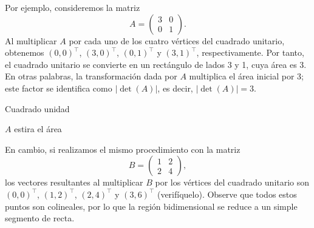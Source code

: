 \documentclass[compacto,10pt]{pubciencias-notas}
\begin{document}
Por ejemplo, consideremos la matriz
\[
    A = \begin{pmatrix} 3 & 0 \\ 0 & 1 \end{pmatrix}.
\]
Al multiplicar $A$ por cada uno de los cuatro vértices del cuadrado unitario, obtenemos $(0,0)^{\top}$, $(3,0)^{\top}$, $(0,1)^{\top}$ y
$(3,1)^{\top}$, respectivamente. Por tanto, el cuadrado unitario se convierte en un rectángulo de lados 3 y 1, cuya área es 3. En otras palabras, la transformación dada por $A$ multiplica el área inicial por 3; este factor se identifica como $|\det(A)|$, es decir, $|\det(A)|=3$.
\begin{center}
\begin{minipage}[t]{0.42\textwidth}
    \centering

    Cuadrado unidad
\end{minipage}
\hfill
\begin{minipage}[t]{0.42\textwidth}
    \centering

    $A$ estira el área
\end{minipage}
\end{center}
En cambio, si realizamos el mismo procedimiento con la matriz 
\[
    B = \begin{pmatrix} 1 & 2 \\ 2 & 4 \end{pmatrix},
\]
los vectores resultantes al multiplicar $B$ por los vértices del cuadrado unitario son $(0,0)^{\top}$, $(1,2)^{\top}$, $(2,4)^{\top}$ y $(3,6)^{\top}$ (verifíquelo). Observe que todos estos puntos son colineales, por lo que la región bidimensional se reduce a un simple segmento de recta.
\end{document}
